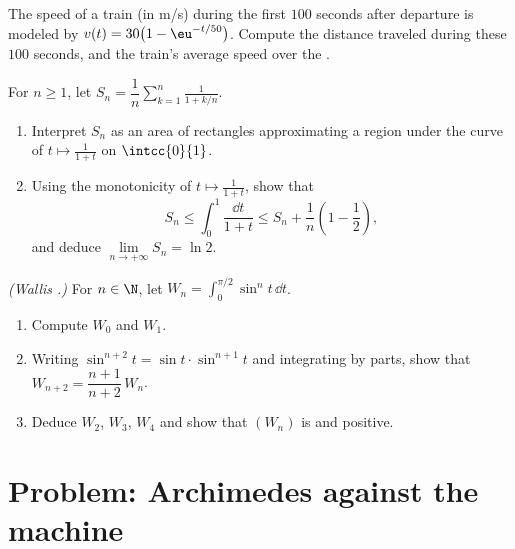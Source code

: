 \begin{exercise}[$\star\star$]\label{exo:g12:integ:7}
The speed of a train (in m/s) during the first $100$ seconds after departure
is modeled by $v(t) = 30\bigl(1 - \eu^{-t/50}\bigr)$. Compute the distance
traveled during these $100$ seconds, and the train's average speed over the
.
\end{exercise}

\begin{exercise}[$\star\star\star$]\label{exo:g12:integ:8}
For $n \geq 1$, let $S_n = \dfrac1n \displaystyle\sum_{k=1}^{n} \frac{1}{1 + k/n}$.
\begin{enumerate}
  \item Interpret $S_n$ as an area of rectangles approximating a region
        under the curve of $t \mapsto \frac{1}{1+t}$ on $\intcc{0}{1}$.
  \item Using the monotonicity of $t \mapsto \frac{1}{1+t}$, show that
        \[
        S_n \leq \int_0^1 \frac{\dd t}{1+t} \leq S_n + \frac1n\left(1 - \frac12\right),
        \]
        and deduce $\lim\limits_{n\to+\infty} S_n = \ln 2$.
\end{enumerate}
\end{exercise}

\begin{exercise}[$\star\star\star$]\label{exo:g12:integ:9}
\emph{(Wallis .)} For $n \in \N$, let
$W_n = \displaystyle\int_0^{\pi/2} \sin^n t\,\dd t$.
\begin{enumerate}
  \item Compute $W_0$ and $W_1$.
  \item Writing $\sin^{n+2}t = \sin t \cdot \sin^{n+1} t$ and integrating by
        parts, show that $W_{n+2} = \dfrac{n+1}{n+2}\,W_n$.
  \item Deduce $W_2$, $W_3$, $W_4$ and show that $(W_n)$ is  and
        positive.
\end{enumerate}
\end{exercise}

\section{Problem: Archimedes against the machine}

